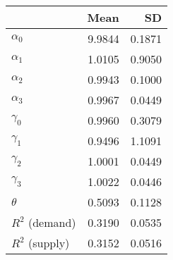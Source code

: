 
\begin{tabular}[t]{lrr}
\toprule
  & Mean & SD\\
\midrule
$\alpha_{0}$ & 9.9844 & 0.1871\\
$\alpha_{1}$ & 1.0105 & 0.9050\\
$\alpha_{2}$ & 0.9943 & 0.1000\\
$\alpha_{3}$ & 0.9967 & 0.0449\\
$\gamma_{0}$ & 0.9960 & 0.3079\\
$\gamma_{1}$ & 0.9496 & 1.1091\\
$\gamma_{2}$ & 1.0001 & 0.0449\\
$\gamma_{3}$ & 1.0022 & 0.0446\\
$\theta$ & 0.5093 & 0.1128\\
$R^{2}$ (demand) & 0.3190 & 0.0535\\
$R^{2}$ (supply) & 0.3152 & 0.0516\\
\bottomrule
\end{tabular}
